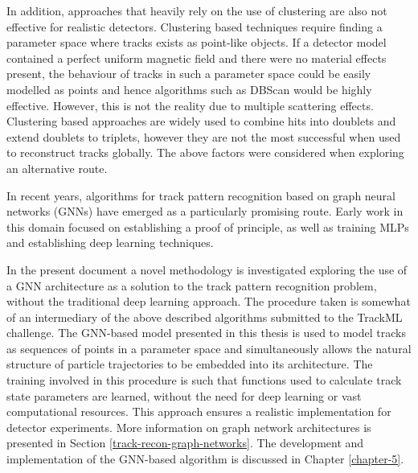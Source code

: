 In addition, approaches that heavily rely on the use of clustering are also not effective for realistic detectors. Clustering based techniques require finding a parameter space where tracks exists as point-like objects. If a detector model contained a perfect uniform magnetic field and there were no material effects present, the behaviour of tracks in such a parameter space could be easily modelled as points and hence algorithms such as DBScan would be highly effective. However, this is not the reality due to multiple scattering effects. Clustering based approaches are widely used to combine hits into doublets and extend doublets to triplets, however they are not the most successful when used to reconstruct tracks globally. The above factors were considered when exploring an alternative route.

In recent years, algorithms for track pattern recognition based on graph neural networks (GNNs) have emerged as a particularly promising route. Early work in this domain focused on establishing a proof of principle, as well as training MLPs and establishing deep learning techniques. 

In the present document a novel methodology is investigated exploring the use of a GNN architecture as a solution to the track pattern recognition problem, without the traditional deep learning approach. The procedure taken is somewhat of an intermediary of the above described algorithms submitted to the TrackML challenge. The GNN-based model presented in this thesis is used to model tracks as sequences of points in a parameter space and simultaneously allows the natural structure of particle trajectories to be embedded into its architecture. The training involved in this procedure is such that functions used to calculate track state parameters are learned, without the need for deep learning or vast computational resources. This approach ensures a realistic implementation for detector experiments. More information on graph network architectures is presented in Section \ref{track-recon-graph-networks}. The development and implementation of the GNN-based algorithm is discussed in Chapter \ref{chapter-5}.


